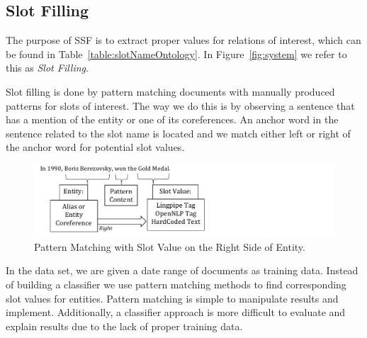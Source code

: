 



\subsection{Slot Filling}
The purpose of SSF is to extract proper values for relations of interest, which can be found in Table~\ref{table:slotNameOntology}.  In Figure~\ref{fig:system} we refer to this as \textit{Slot Filling}. 

Slot filling is done by pattern matching documents with manually produced patterns for slots of interest. The way we do this is by observing a sentence that has a mention of the entity or one of its coreferences. An anchor word in the sentence related to the slot name is located and we match either left or right of the anchor word for potential slot values. 


\begin{figure}
\centering
\includegraphics[width = 13cm]{./images/Pattern-crop.pdf}
\vspace*{-.1in} \caption{Pattern Matching with Slot Value on the Right Side of Entity. }\label{fig:pattern}
\vspace*{-.2in}
\end{figure}

In the data set, we are given a date range of documents as training data. Instead of building a classifier we use pattern matching methods to find corresponding slot values for entities. 
Pattern matching is simple to manipulate results and implement. Additionally, a classifier approach is more difficult to evaluate and explain results due to the lack of proper training data.

